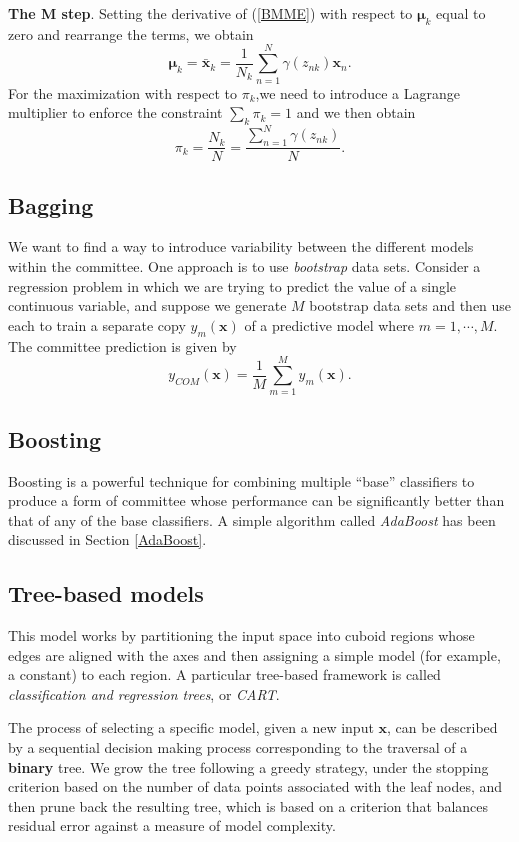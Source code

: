 \documentclass[a4paper]{report}
\renewcommand{\bf}{\mathbf}
\newcommand{\imp}[1]{{\color{blue}\textit{#1}}}
\newcommand{\bs}{\boldsymbol}
\begin{document}
\textbf{The M step}. Setting the derivative of (\ref{BMME}) with respect to $\bs{\mu}_k$ equal to zero and rearrange the terms, we obtain
\begin{equation}
	\bs{\mu}_k = \bar{\bf{x}}_k = \frac{1}{N_k}\sum_{n=1}^N \gamma(z_{nk}) \bf{x}_n.
\end{equation}
For the maximization with respect to $\pi_k$,we need to introduce a Lagrange multiplier to enforce the constraint $\sum_k \pi_k = 1$ and we then obtain
\begin{equation}
	\pi_k = \frac{N_k}{N} = \frac{\sum_{n=1}^N \gamma(z_{nk})}{N}.
\end{equation}
\subsection{Bagging}
We want to find a way to introduce variability between the different models within the committee. One approach is to use \imp{bootstrap} data sets. Consider a regression problem in which we are trying to predict the value of a single continuous variable, and suppose we generate $M$ bootstrap data sets and then use each to train a separate copy $y_m(\bf{x})$ of a predictive model where $m=1,\cdots,M$. The committee prediction is given by
\begin{equation}
	y_{COM}(\bf{x}) = \frac{1}{M} \sum_{m=1}^M y_m(\bf{x}).
\end{equation}
\subsection{Boosting}
Boosting is a powerful technique for combining multiple ``base'' classifiers to produce a form of committee whose performance can be significantly better than that of any of the base classifiers. A simple algorithm called \imp{AdaBoost} has been discussed in Section \ref{AdaBoost}.
\subsection{Tree-based models}
This model works by partitioning the input space into cuboid regions whose edges are aligned with the axes and then assigning a simple model (for example, a constant) to each region. A particular tree-based framework is called \imp{classification and regression trees}, or \imp{CART}. 

The process of selecting a specific model, given a new input $\bf{x}$, can be described by a sequential decision making process corresponding to the traversal of a \textbf{binary} tree. We grow the tree following a greedy strategy, under the stopping criterion based on the number of data points associated with the leaf nodes, and then prune back the resulting tree, which is based on a criterion that balances residual error against a measure of model complexity.
\end{document}
